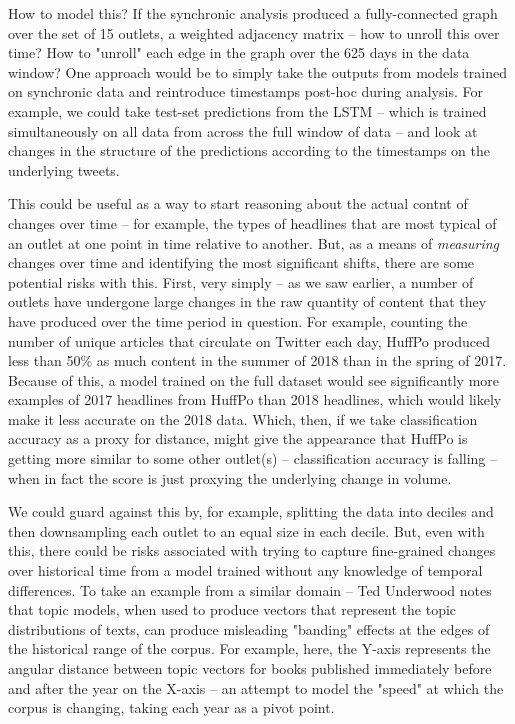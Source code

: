 \documentclass{scrartcl}
\begin{document}
How to model this? If the synchronic analysis produced a fully-connected graph over the set of 15 outlets, a weighted adjacency matrix -- how to unroll this over time? How to "unroll" each edge in the graph over the 625 days in the data window? One approach would be to simply take the outputs from models trained on synchronic data and reintroduce timestamps post-hoc during analysis. For example, we could take test-set predictions from the LSTM -- which is trained simultaneously on all data from across the full window of data -- and look at changes in the structure of the predictions according to the timestamps on the underlying tweets.

This could be useful as a way to start reasoning about the actual contnt of changes over time -- for example, the types of headlines that are most typical of an outlet at one point in time relative to another. But, as a means of \textit{measuring} changes over time and identifying the most significant shifts, there are some potential risks with this. First, very simply -- as we saw earlier, a number of outlets have undergone large changes in the raw quantity of content that they have produced over the time period in question. For example, counting the number of unique articles that circulate on Twitter each day, HuffPo produced less than 50\% as much content in the summer of 2018 than in the spring of 2017. Because of this, a model trained on the full dataset would see significantly more examples of 2017 headlines from HuffPo than 2018 headlines, which would likely make it less accurate on the 2018 data. Which, then, if we take classification accuracy as a proxy for distance, might give the appearance that HuffPo is getting more similar to some other outlet(s) -- classification accuracy is falling -- when in fact the score is just proxying the underlying change in volume.

We could guard against this by, for example, splitting the data into deciles and then downsampling each outlet to an equal size in each decile. But, even with this, there could be risks associated with trying to capture fine-grained changes over historical time from a model trained without any knowledge of temporal differences. To take an example from a similar domain -- Ted Underwood notes that topic models, when used to produce vectors that represent the topic distributions of texts, can produce misleading "banding" effects at the edges of the historical range of the corpus.\cite{underwood2018warp} For example, here, the Y-axis represents the angular distance between topic vectors for books published immediately before and after the year on the X-axis -- an attempt to model the "speed" at which the corpus is changing, taking each year as a pivot point.
\end{document}
